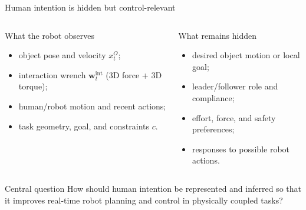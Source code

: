 \documentclass[aspectratio=169,11pt]{beamer}
\begin{document}
\begin{frame}{Human intention is hidden but control-relevant}
\begin{columns}[T,onlytextwidth]
  \begin{block}{What the robot observes}
  \begin{itemize}
    \item object pose and velocity $x_t^O$;
    \item interaction wrench $\mathbf{w}_t^{\mathrm{int}}$ (3D force + 3D torque);
    \item human/robot motion and recent actions;
    \item task geometry, goal, and constraints $c$.
  \end{itemize}
  \end{block}
  \begin{block}{What remains hidden}
  \begin{itemize}
    \item desired object motion or local goal;
    \item leader/follower role and compliance;
    \item effort, force, and safety preferences;
    \item responses to possible robot actions.
  \end{itemize}
  \end{block}
\end{columns}
\vspace{0.25cm}
\begin{alertblock}{Central question}
How should human intention be represented and inferred so that it improves real-time robot planning and control in physically coupled tasks?
\end{alertblock}
\end{frame}
\end{document}
